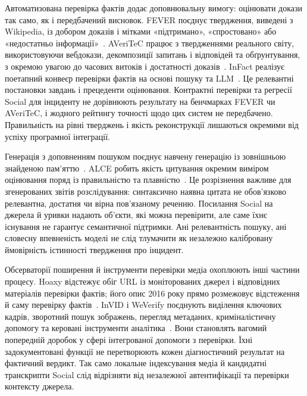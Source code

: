 Автоматизована перевірка фактів додає доповнювальну вимогу: оцінювати докази так само, як і передбачений висновок. FEVER поєднує твердження, виведені з Wikipedia, із добором доказів і мітками «підтримано», «спростовано» або «недостатньо інформації»~\cite{thorne2018fever}. AVeriTeC працює з твердженнями реального світу, використовуючи вебдокази, декомпозиції запитань і відповідей та обґрунтування, з окремою увагою до часових витоків і достатності доказів~\cite{schlichtkrull2023averitec}. InFact реалізує поетапний конвеєр перевірки фактів на основі пошуку та LLM~\cite{rothermel2024infact}. Це релевантні постановки завдань і прецеденти оцінювання. Контрактні перевірки та регресії Social для інциденту не дорівнюють результату на бенчмарках FEVER чи AVeriTeC, і жодного рейтингу точності щодо цих систем не передбачено. Правильність на рівні тверджень і якість реконструкції лишаються окремими від успіху програмної інтеграції.

Генерація з доповненням пошуком поєднує навчену генерацію із зовнішньою знайденою пам'яттю~\cite{lewis2020rag}. ALCE робить якість цитування окремим виміром оцінювання поряд із правильністю та плавністю~\cite{gao2023alce}. Це розрізнення важливе для згенерованих звітів розслідування: синтаксично наявна цитата не обов'язково релевантна, достатня чи вірна пов'язаному реченню. Посилання Social на джерела й уривки надають об'єкти, які можна перевірити, але саме їхнє існування не гарантує семантичної підтримки. Ані релевантність пошуку, ані словесну впевненість моделі не слід тлумачити як незалежно калібровану ймовірність істинності твердження про інцидент.

Обсерваторії поширення й інструменти перевірки медіа охоплюють інші частини процесу. Hoaxy відстежує обіг URL із моніторованих джерел і відповідних матеріалів перевірки фактів; його опис 2016 року прямо розмежовує відстеження й саму перевірку фактів~\cite{shao2016hoaxy}. InVID і WeVerify поєднують виділення ключових кадрів, зворотний пошук зображень, перегляд метаданих, криміналістичну допомогу та керовані інструменти аналітика~\cite{invidVerificationPlugin,weverifyVerificationPlugin}. Вони становлять вагомий попередній доробок у сфері інтегрованої допомоги з перевірки. Їхні задокументовані функції не перетворюють кожен діагностичний результат на фактичний вердикт. Так само локальне індексування медіа й кандидатні транскрипти Social слід відрізняти від незалежної автентифікації та перевірки контексту джерела.

